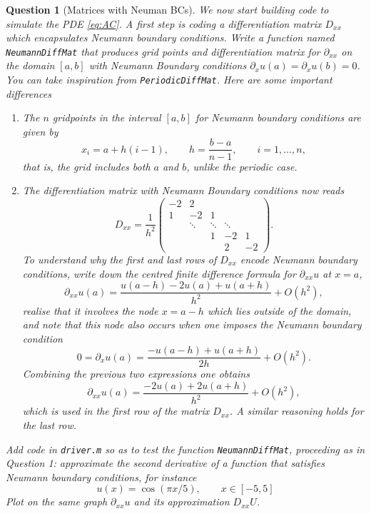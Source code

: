 \documentclass[a4paper]{siamart220329}
\theoremstyle{plain}
\newtheorem{question}{Question}
\begin{document}
\begin{question}[Matrices with Neuman BCs] \label{question:NeumanDiff}
We now start building code to simulate the PDE \cref{eq:AC}. A first step is coding a
differentiation matrix $D_{x x}$ which encapsulates Neumann boundary conditions. Write a function
named \lstinline|NeumannDiffMat| that produces grid points and differentiation matrix for
$\partial_{x x}$ on the domain $[a,b]$ with Neumann Boundary conditions $\partial_x
u(a) = \partial_x u(b) = 0$. You can take inspiration from \lstinline|PeriodicDiffMat|. Here are some
important differences
\begin{enumerate}
  \item The $n$ gridpoints in the interval $[a,b]$ for Neumann boundary conditions
    are given by
    \[
      x_i = a + h (i-1), \qquad h = \frac{b-a}{n-1}, \qquad i = 1,\ldots,n,
    \]
    that is, the grid includes both $a$ and $b$, unlike the periodic case.
  \item The differentiation matrix with Neumann Boundary conditions now reads
    \[
      D_{x x} =
\frac{1}{h^2}
\begin{pmatrix}
-2 & 2 & & &  \\
1 & -2 & 1 & & \\
& \ddots & \ddots & \ddots & \\
& & 1 & -2 & 1 \\
& & & 2 & -2 
\end{pmatrix}.
  \]
To understand why the first and last rows of $D_{x x}$ encode Neumann boundary
conditions, write down the centred finite difference formula for $\partial_{x x} u$
at $x=a$,
\[
  \partial_{x x}u(a) = \frac{ u(a-h) -2u(a) + u(a+h)}{h^2} + O(h^2),
\]
realise that it involves the node $x = a-h$ which lies outside of the domain, and
note that this node also occurs when one imposes the Neumann boundary condition
\[
  0 = \partial_{x}u(a) = \frac{ -u(a-h) + u(a+h)}{2h} + O(h^2).
\]
Combining the previous two expressions one obtains
\[
  \partial_{x x}u(a) = \frac{ -2u(a) + 2 u(a+h)}{h^2} + O(h^2),
\]
which is used in the first row of the matrix $D_{x x}$. A similar reasoning holds for the
last row.
\end{enumerate}

Add code in \lstinline|driver.m| so as to test the function
\lstinline|NeumannDiffMat|, proceeding as in Question 1: approximate the
second derivative of a function that satisfies Neumann boundary conditions, for
instance
\[
  u(x) = \cos(\pi x / 5), \qquad x \in [-5,5]
\]
Plot on the same graph $\partial_{x x} u$ and its approximation $D_{x x} U$.
\end{question}
\end{document}
